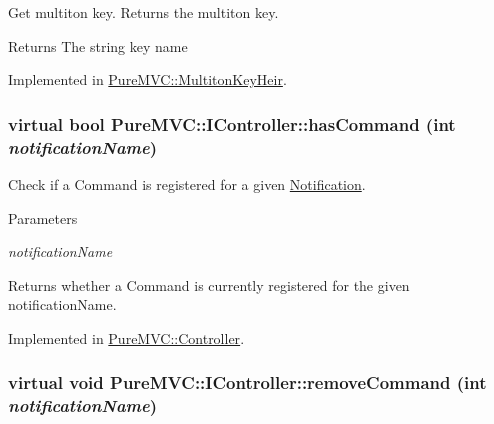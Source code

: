 Get multiton key. Returns the multiton key. \begin{DoxyReturn}{Returns}
The string key name 
\end{DoxyReturn}


Implemented in \hyperlink{class_pure_m_v_c_1_1_multiton_key_heir_aa5622459d33380deb08dc3cab8b991c7}{PureMVC::MultitonKeyHeir}.\hypertarget{class_pure_m_v_c_1_1_i_controller_a0cb56adf2c1300913af0458ba730cbf4}{
\subsubsection[{hasCommand}]{\setlength{\rightskip}{0pt plus 5cm}virtual bool PureMVC::IController::hasCommand (int {\em notificationName})}}
\label{class_pure_m_v_c_1_1_i_controller_a0cb56adf2c1300913af0458ba730cbf4}


Check if a Command is registered for a given \hyperlink{class_pure_m_v_c_1_1_notification}{Notification}. 
\begin{DoxyParams}{Parameters}
\item[{\em notificationName}]\end{DoxyParams}
\begin{DoxyReturn}{Returns}
whether a Command is currently registered for the given {\ttfamily notificationName}. 
\end{DoxyReturn}


Implemented in \hyperlink{class_pure_m_v_c_1_1_controller_ab434278b9236beb9d5ffb55482233ef9}{PureMVC::Controller}.\hypertarget{class_pure_m_v_c_1_1_i_controller_a5d646a36a3d7fc08a0cefb17662ce8ef}{
\subsubsection[{removeCommand}]{\setlength{\rightskip}{0pt plus 5cm}virtual void PureMVC::IController::removeCommand (int {\em notificationName})}}
\label{class_pure_m_v_c_1_1_i_controller_a5d646a36a3d7fc08a0cefb17662ce8ef}


